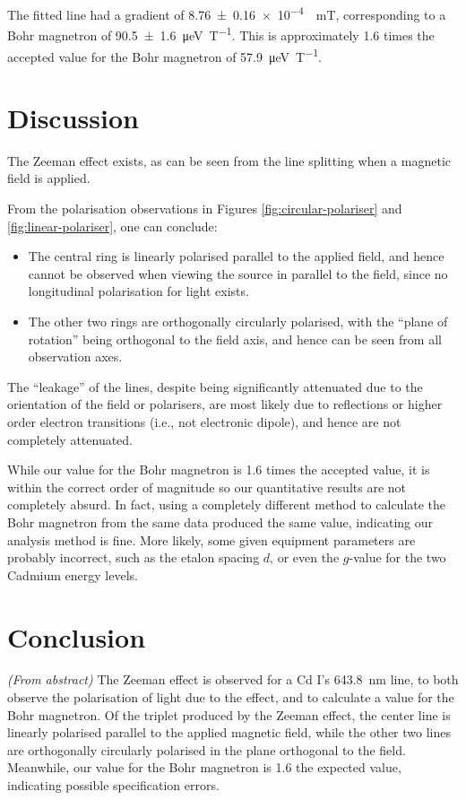 \documentclass[a4paper]{scrartcl}
\begin{document}
The fitted line had a gradient of \SI{8.76 \pm 0.16e-4}{\per\milli\tesla}, corresponding to a Bohr magnetron of \SI{90.5 \pm 1.6}{\micro\electronvolt\per\tesla}. This is approximately 1.6 times the accepted value for the Bohr magnetron of \SI{57.9}{\micro\electronvolt\per\tesla}.

\section{Discussion}
The Zeeman effect exists, as can be seen from the line splitting when a magnetic field is applied.

From the polarisation observations in Figures \ref{fig:circular-polariser} and \ref{fig:linear-polariser}, one can conclude:
\begin{itemize}
    \item The central ring is linearly polarised parallel to the applied field, and hence cannot be observed when viewing the source in parallel to the field, since no longitudinal polarisation for light exists.
    \item The other two rings are orthogonally circularly polarised, with the ``plane of rotation'' being orthogonal to the field axis, and hence can be seen from all observation axes. 
\end{itemize}

The ``leakage'' of the lines, despite being significantly attenuated due to the orientation of the field or polarisers, are most likely due to reflections or higher order electron transitions (i.e., not electronic dipole), and hence are not completely attenuated.

While our value for the Bohr magnetron is 1.6 times the accepted value, it is within the correct order of magnitude so our quantitative results are not completely absurd. In fact, using a completely different method to calculate the Bohr magnetron from the same data produced the same value, indicating our analysis method is fine. More likely, some given equipment parameters are probably incorrect, such as the etalon spacing \(d\), or even the \(g\)-value for the two Cadmium energy levels.

\section{Conclusion}
\emph{(From abstract)} The Zeeman effect is observed for a Cd I's \SI{643.8}{\nano\metre} line, to both observe the polarisation of light due to the effect, and to calculate a value for the Bohr magnetron. Of the triplet produced by the Zeeman effect, the center line is linearly polarised parallel to the applied magnetic field, while the other two lines are orthogonally circularly polarised in the plane orthogonal to the field. Meanwhile, our value for the Bohr magnetron is 1.6 the expected value, indicating possible specification errors.
\end{document}
